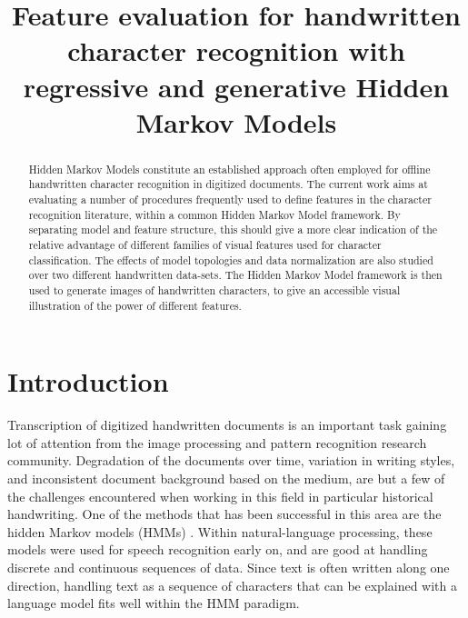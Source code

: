 \documentclass[runningheads]{llncs}
\begin{document}
\pagestyle{headings}

\mainmatter

\title{Feature evaluation for handwritten character recognition with regressive and generative Hidden Markov Models}


\maketitle

\begin{abstract}
Hidden Markov Models constitute an established approach often employed for offline handwritten character recognition in digitized documents. The current work aims at evaluating a number of procedures frequently used to define features in the character recognition literature, within a common Hidden Markov Model framework. By separating model and feature structure, this should give a more clear indication of the relative advantage of different families of visual features used for character classification. The effects of model topologies and data normalization are also studied over two different handwritten data-sets. The Hidden Markov Model framework is then used to generate images of handwritten characters, to give an accessible visual illustration of the power of different features.
\end{abstract}

\section{Introduction}
\label{sec:intro}
Transcription of digitized handwritten documents is an important task gaining lot of attention from the image processing and pattern recognition research community. Degradation of the documents over time, variation in writing styles, and inconsistent document background based on the medium, are but a few of the challenges encountered when working in this field in particular historical handwriting. One of the methods that has been successful in this area are the hidden Markov models (HMMs) \cite{Fink09}. Within natural-language processing, these models were used for speech recognition early on, and are good at handling discrete and continuous sequences of data. Since text is often written along one direction, handling text as a sequence of characters that can be explained with a language model fits well within the HMM paradigm.
\end{document}

